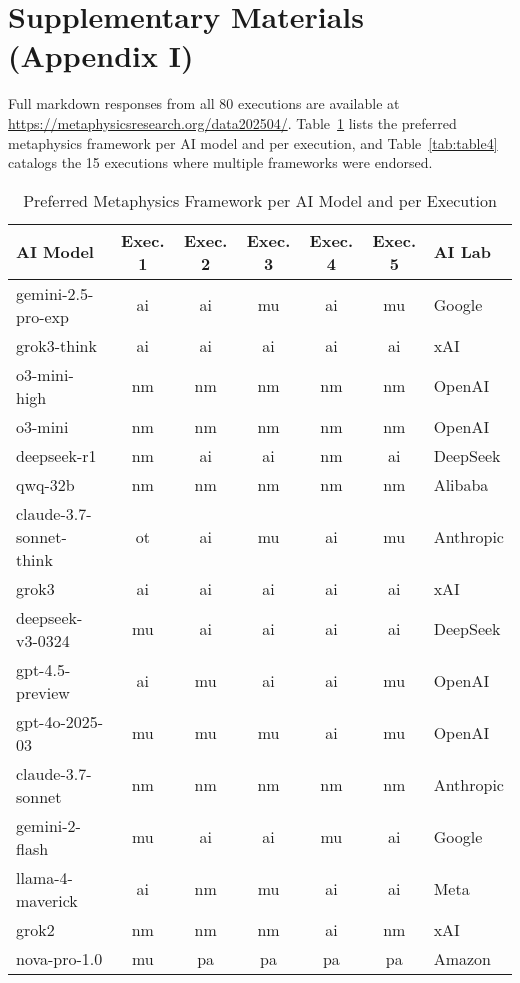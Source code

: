 \documentclass[11pt]{article}
\begin{document}
\appendix

\section{Supplementary Materials (Appendix I)}
Full markdown responses from all 80 executions are available at \url{https://metaphysicsresearch.org/data202504/}. Table~\ref{tab:table3} lists the preferred metaphysics framework per AI model and per execution, and Table~\ref{tab:table4} catalogs the 15 executions where multiple frameworks were endorsed.

\begin{table}[ht!]
\centering
\caption{Preferred Metaphysics Framework per AI Model and per Execution}
\label{tab:table3}
\begin{tabular}{lcccccl}
\toprule
\textbf{AI Model} & \textbf{Exec. 1} & \textbf{Exec. 2} & \textbf{Exec. 3} & \textbf{Exec. 4} & \textbf{Exec. 5} & \textbf{AI Lab} \\
\midrule
gemini-2.5-pro-exp      & ai & ai & mu & ai & mu & Google \\
grok3-think            & ai & ai & ai & ai & ai & xAI \\
o3-mini-high           & nm & nm & nm & nm & nm & OpenAI \\
o3-mini                & nm & nm & nm & nm & nm & OpenAI \\
deepseek-r1            & nm & ai & ai & nm & ai & DeepSeek \\
qwq-32b                & nm & nm & nm & nm & nm & Alibaba \\
claude-3.7-sonnet-think& ot & ai & mu & ai & mu & Anthropic \\
grok3                  & ai & ai & ai & ai & ai & xAI \\
deepseek-v3-0324       & mu & ai & ai & ai & ai & DeepSeek \\
gpt-4.5-preview        & ai & mu & ai & ai & mu & OpenAI \\
gpt-4o-2025-03         & mu & mu & mu & ai & mu & OpenAI \\
claude-3.7-sonnet      & nm & nm & nm & nm & nm & Anthropic \\
gemini-2-flash         & mu & ai & ai & mu & ai & Google \\
llama-4-maverick       & ai & nm & mu & ai & ai & Meta \\
grok2                  & nm & nm & nm & ai & nm & xAI \\
nova-pro-1.0           & mu & pa & pa & pa & pa & Amazon \\
\bottomrule
\end{tabular}
\end{table}
\end{document}
